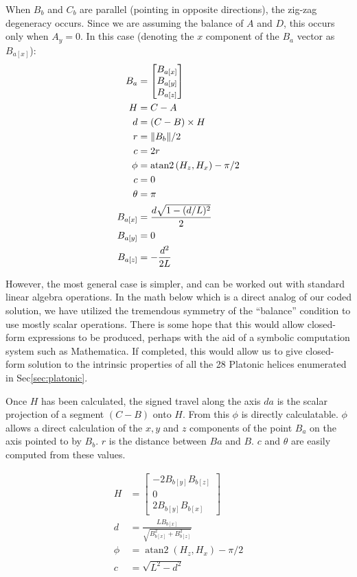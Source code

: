 \documentclass[11pt]{article}
\DeclarePairedDelimiter{\norm}{\lVert}{\rVert}
\DeclareMathOperator{\atantwo}{atan2}
\begin{document}
{When $B_b$ and $C_b$ are parallel (pointing in opposite directions),
the zig-zag degeneracy occurs. Since we are assuming
the balance of $A$ and $D$, this occurs only when $A_y = 0$.
In this case (denoting the $x$ component of the $B_a$ vector as $B_{a[x]}$):
\begin{align}
  B_{a} &= \begin{bmatrix} B_{a[x]} \\ B_{a[y]} \\ B_{a[z]}  \end{bmatrix} \\
  H &=  C - A \\
  d &= (C - B) \times H \\
  r &= \norm{B_b} / 2 \\
  c &= 2 r\\
  \phi &= \atantwo{(H_z,H_x)} - \pi/2 \\
  c &= 0 \\
  \theta &= \pi \\
  B_{a[x]} &= \frac{d\sqrt{1 - (d/L)^2}}{2} \\
  B_{a[y]} &= 0 \\
  B_{a[z]} &= -\frac{d^2}{2L} \\
\end{align}

However, the most general case is simpler, and can be worked
out with standard linear algebra operations. In the math below
which is a direct analog of our coded solution, we have
utilized the tremendous symmetry of the ``balance'' condition
to use mostly scalar operations. There is some hope that
this would allow closed-form expressions to be produced, perhaps
with the aid of a symbolic computation system such as
Mathematica\cite{Mathematica}. If completed, this would
allow us to give closed-form solution to the intrinsic properties
of all the 28 Platonic helices enumerated in Sec\ref{sec:platonic}.

Once $H$ has been calculated, the signed travel along the axis $da$ is
the scalar projection of a segment $(C - B)$ onto $H$.
From this $\phi$ is directly calculatable. $\phi$ allows
a direct calculation of the $x,y$ and $z$ components of the
point $B_a$ on the axis pointed to by $B_b$.
$r$ is the distance between $Ba$ and $B$. $c$ and $\theta$
are easily computed from these values.

\begin{align}
  H &=  \begin{bmatrix} -2 B_{b[y]} B_{b[z]} \\ 0 \\ 2 B_{b[y]} B_{b[x]}  \end{bmatrix} \\
  d &= \frac{L B_{b[x]}}{\sqrt{B_{b[x]}^2 + B_{b[z]}^2}}  \\
  \phi &= \atantwo{(H_z,H_x)} - \pi/2  \\
  c &= \sqrt{L^2 - d^2} \\
\end{align}

}
\end{document}
